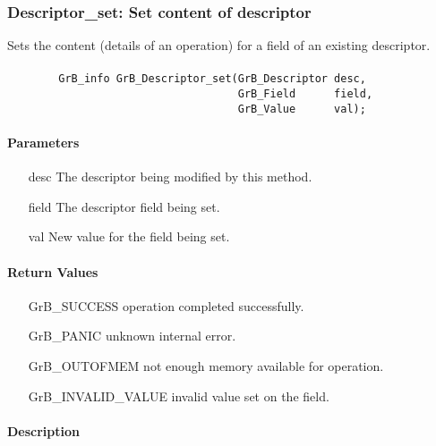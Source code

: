\subsubsection{{\sf Descriptor\_set}: Set content of descriptor}

Sets the content (details of an operation) for a field of an existing
descriptor.

\paragraph{\syntax}

\begin{verbatim}
        GrB_info GrB_Descriptor_set(GrB_Descriptor desc,
                                    GrB_Field      field,
                                    GrB_Value      val);
\end{verbatim}

\paragraph{Parameters}

\begin{itemize}[leftmargin=1.1in]
    \item[{\sf desc}]  The descriptor being modified by this method.
    \item[{\sf field}] The descriptor field being set.
    \item[{\sf val}]   New value for the field being set.
\end{itemize}

\paragraph{Return Values}

\begin{itemize}[leftmargin=2.1in]
\item[{\sf GrB\_SUCCESS}]           operation completed successfully.
\item[{\sf GrB\_PANIC}]             unknown internal error.
\item[{\sf GrB\_OUTOFMEM}]          not enough memory available for operation.
\item[{\sf GrB\_INVALID\_VALUE}]    invalid value set on the field.
\end{itemize}

\paragraph{Description}

